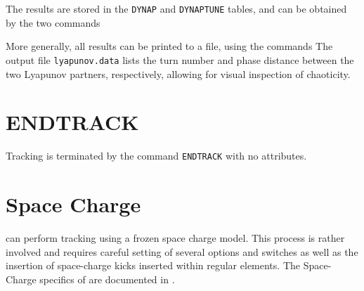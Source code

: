 The results are stored in the \texttt{DYNAP} and \texttt{DYNAPTUNE}
tables, and can be obtained by the two commands  
 

More generally, all results can be printed to a file, using the commands 
The output file \texttt{lyapunov.data} lists the turn number and phase
distance between the two Lyapunov partners, respectively, allowing for
visual inspection of chaoticity.
 
\section{ENDTRACK}
\label{sec:endtrack}

Tracking is terminated by the command \texttt{ENDTRACK} with no
attributes. 


\section{Space Charge}

\madx can perform tracking using a frozen space charge model.
This process is rather involved and requires careful setting of several options 
and switches as well as the insertion of space-charge kicks inserted within 
regular elements. The Space-Charge specifics of \madx are documented in 
\cite{kapin2013}.


